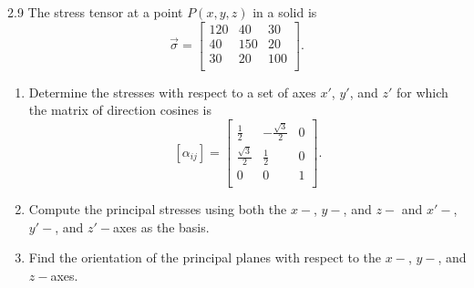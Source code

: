 
\begin{problem}{2.9}
  The stress tensor at a point $P(x,y,z)$ in a solid is
  \begin{equation*}
    \Vec{\sigma} = \begin{bmatrix}
      \num{120}  & \num{40}  & \num{30} \\
    \num{40}  & \num{150}  & \num{20} \\
    \num{30}  & \num{20}  & \num{100} \\
    \end{bmatrix}
  .\end{equation*}
  
  \begin{enumerate}[label=(\alph*)]
    \item Determine the stresses with respect to a set of axes $x'$, $y'$, and $z'$ for which the matrix of direction cosines is
      \begin{equation*}
        \left[ \alpha_{ij} \right] = \begin{bmatrix}
          \frac{1}{2} & - \frac{\sqrt{3}}{2} & 0\\
        \frac{\sqrt{3}}{2} & \frac{1}{2} & 0\\
        0 & 0 & 1\\
        \end{bmatrix}
      .\end{equation*}
    \item Compute the principal stresses using both the $x-$, $y-$, and $z-$ and $x'-$, $y'-$, and $z'-$axes as the basis.
    \item Find the orientation of the principal planes with respect to the $x-$, $y-$, and $z-$axes.
  \end{enumerate}
\end{problem}


